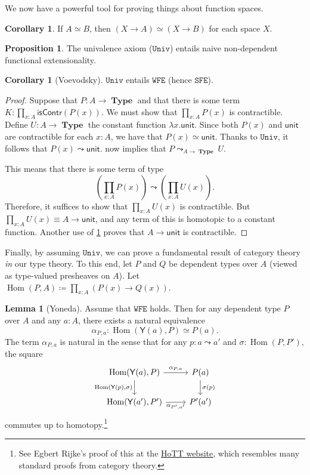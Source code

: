 \documentclass[10pt,letterpaper,cm]{nupset}
\theoremstyle{definition}
\theoremstyle{theorem}
\newtheorem{lemma}[definition]{Lemma}
\newtheorem{prop}[definition]{Proposition}
\newtheorem{corollary}[definition]{Corollary}
\theoremstyle{remark}
\newcommand{\1}{\mathbf{1}}
\newcommand{\wfe}{\mathtt{WFE}}
\newcommand{\sfe}{\mathtt{SFE}}
\newcommand{\univ}{\mathtt{Univ}}
\newcommand{\0}{\vec 0}
\DeclareMathOperator{\Hom}{Hom}
\DeclareMathOperator{\type}{\mathbf{Type}}
\begin{document}
We now have a powerful tool for proving things about function spaces.

\begin{corollary}
If $A \simeq B$, then $\left(X \to A\right) \simeq \left(X \to B\right)$ for each space $X$.
\end{corollary}

\begin{prop}\label{PP}
The univalence axiom ($\univ$) entails naive non-dependent functional extensionality. 
\end{prop}

\begin{corollary}[Voevodsky]
$\univ$ entails $\wfe$ (hence $\sfe$).
\end{corollary}
\begin{proof}
Suppose that $P: A \to \type$ and that there is some term $K: \prod_{x:A}\mathsf{isContr}(P(x))$. We must show that $\prod_{x:A} P(x)$ is contractible.  Define $U: A \to \type$ the constant function $\lambda x. \mathsf{unit}$. Since both $P(x)$ and $ \mathsf{unit}$ are contractible for each $x:A$, we have that $P(x) \simeq  \mathsf{unit}$. Thanks to $\univ$, it follows that $P(x) \leadsto  \mathsf{unit}$.   now implies that $P\leadsto_{A \to \type} U$.

\smallskip

 This means that there is some term of type $$  \left(\prod_{x:A} P(x) \right) \leadsto \left(\prod_{x:A} U(x) \right)  .$$ Therefore, it suffices to show that $\prod_{x:A}U(x)$ is contractible.  But $\prod_{x:A}U(x) \equiv A \to \mathsf{unit}$, and any term of this is homotopic to a constant function. Another use of \cref{PP} proves that $A \to \mathsf{unit}$ is contractible. 
\end{proof}

Finally, by assuming $\univ$, we can prove a fundamental result of category theory \emph{in} our type theory. To this end, let $P$ and $Q$ be dependent types over $A$ (viewed as type-valued presheaves on $A$). Let $\Hom(P, A) \coloneqq \prod_{x:A}\left(P(x) \to Q(x)\right)$.


\begin{lemma}[Yoneda]
Assume that $\wfe$ holds. Then for any dependent type $P$ over $A$ and any $a: A$, there exists a natural equivalence $$ \alpha_{P,a} :\Hom(\mathsf{Y}(a), P)\simeq P(a) . $$ The term $ \alpha_{P,a} $ is natural in the sense that for any $p: a\leadsto a'$ and $\sigma : \Hom(P, P')$, the square
\[
\begin{tikzcd}
{\Hom(\mathsf{Y}(a), P)} \arrow[r, "{\alpha_{P,a}}"] \arrow[d, "{\Hom(\mathsf{Y}(p), \sigma)}"'] & P(a) \arrow[d, "\sigma(p)"] \\
{\Hom(\mathsf{Y}(a'), P')} \arrow[r, "{\alpha_{P', a'}}"'] & P'(a')
\end{tikzcd}\] commutes up to homotopy.\footnote{See Egbert Rijke's proof of this at the \href{https://homotopytypetheory.org/2012/05/02/a-type-theoretical-yoneda-lemma/}{HoTT website}, which resembles many standard proofs from category theory.}
\end{lemma}
\end{document}
